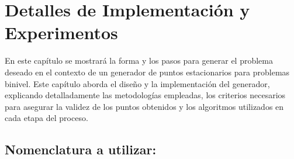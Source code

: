 \chapter{Detalles de Implementación y Experimentos}\label{chapter:implementation}

En este capítulo se mostrará la forma y los pasos para generar el problema deseado en el contexto de un generador de puntos estacionarios para problemas binivel. Este capítulo aborda el diseño y la implementación del generador, explicando detalladamente las metodologías empleadas, los criterios necesarios para asegurar la validez de los puntos obtenidos y los algoritmos utilizados en cada etapa del proceso.

\section{Nomenclatura a utilizar:}

